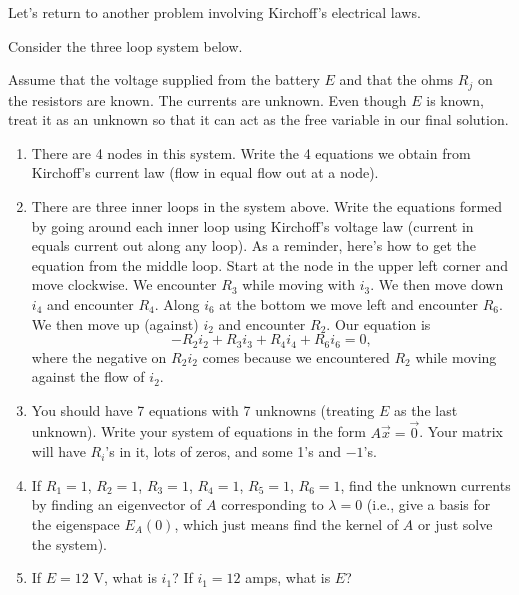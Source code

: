 \mysubsection{\ideacon}
Let's return to another problem involving Kirchoff's electrical laws. 

\begin{problem}
Consider the three loop system below. 
\begin{center}
 
\end{center}
Assume that the voltage supplied from the battery $E$ and that the ohms $R_j$ on the resistors are known. The currents are unknown. Even though $E$ is known, treat it as an unknown so that it can act as the free variable in our final solution. 
\begin{enumerate}
 \item There are 4 nodes in this system. Write the 4 equations we obtain from Kirchoff's current law (flow in equal flow out at a node). 
 \item There are three inner loops in the system above. Write the equations formed by going around each inner loop using Kirchoff's voltage law (current in equals current out along any loop). As a reminder, here's how to get the equation from the middle loop. Start at the node in the upper left corner and move clockwise.  We encounter $R_3$ while moving with $i_3$.  We then move down $i_4$ and encounter $R_4$.  Along $i_6$ at the bottom we move left and encounter $R_6$.  We then move up (against) $i_2$ and encounter $R_2$.  Our equation is $$-R_2i_2+R_3i_3+R_4i_4+R_6i_6=0,$$ where the negative on $R_2i_2$ comes because we encountered $R_2$ while moving against the flow of $i_2$.
 \item You should have 7 equations with 7 unknowns (treating $E$ as the last unknown).  Write your system of equations in the form $A\vec x = \vec 0$.  Your matrix will have $R_i$'s in it, lots of zeros, and some 1's and $-1$'s.
\item If $R_1 = 1$, $R_2 = 1$, $R_3 = 1$, $R_4 = 1$, $R_5 = 1$, $R_6 = 1$, find the unknown currents by finding an eigenvector of $A$ corresponding to $\lambda = 0$ (i.e., give a basis for the eigenspace $E_A(0)$, which just means find the kernel of $A$ or just solve the system). 
 \item If $E=12$ V, what is $i_1$?  If $i_1=12$ amps, what is $E$?
\end{enumerate}
\end{problem}
